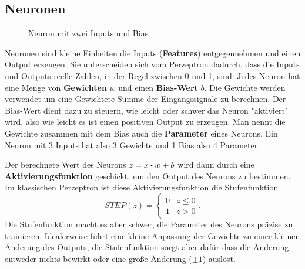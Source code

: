 \subsection{Neuronen}

\begin{figure}[!hbt]
    \centering
    \caption{Neuron mit zwei Inputs und Bias}
\end{figure}

Neuronen sind kleine Einheiten die Inputs (\textbf{Features}) entgegennehmen und einen Output erzeugen. Sie unterscheiden sich vom Perzeptron dadurch, dass die Inputs und Outputs reelle Zahlen, in der Regel zwischen 0 und 1, sind. Jedes Neuron hat eine Menge von \textbf{Gewichten} $w$ und einen \textbf{Bias-Wert} $b$. Die Gewichte werden verwendet um eine Gewichtete Summe der Eingangssignale zu berechnen. Der Bias-Wert dient dazu zu steuern, wie leicht oder schwer das Neuron "aktiviert" wird, also wie leicht es ist einen positiven Output zu erzeugen. Man nennt die Gewichte zusammen mit dem Bias auch die \textbf{Parameter} eines Neurons. Ein Neuron mit 3 Inputs hat also 3 Gewichte und 1 Bias also 4 Parameter.


Der berechnete Wert des Neurons $z = x \bigcdot w + b$ wird dann durch eine \textbf{Aktivierungsfunktion} geschickt, um den Output des Neurons zu bestimmen. Im klassischen Perzeptron ist diese Aktivierungsfunktion die Stufenfunktion
\begin{equation}
    STEP(z) = \begin{cases}
                  0 & z \le 0\\
                  1 & z > 0
    \end{cases}.
\end{equation}
Die Stufenfunktion macht es aber schwer, die Parameter des Neurons präzise zu trainieren. Idealerweise führt eine kleine Anpassung der Gewichte zu einer kleinen Änderung des Outputs, die Stufenfunktion sorgt aber dafür dass die Änderung entweder nichts bewirkt oder eine große Änderung ($\pm 1$) auslöst.

